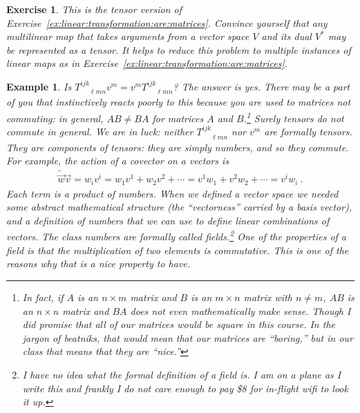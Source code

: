 \documentclass[
  11pt,
	colorful,
	raggedright,
]{tufte-style-thesis-flip}
\newtheorem{exercise}{Exercise}[section]
\newtheorem{example}{Example}[section]
\begin{document}
\begin{exercise}
This is the tensor version of Exercise~\ref{ex:linear:transformation:are:matrices}. Convince yourself that any multilinear map that takes arguments from a vector space $V$ and its dual $V^*$ may be represented as a tensor. It helps to reduce this problem to multiple instances of linear maps as in Exercise~\ref{ex:linear:transformation:are:matrices}.
\end{exercise}

\begin{example}
Is $T^{ijk}_{\phantom{ijk}\ell m n}v^m = v^m T^{ijk}_{\phantom{ijk}\ell m n}$? The answer is yes. There may be a part of you that instinctively reacts poorly to this because you are used to matrices not commuting: in general, $AB \neq BA$ for matrices $A$ and $B$.\footnote{In fact, if $A$ is an $n\times m$ matrix and $B$ is an $m\times n$ matrix with $n\neq m$, $AB$ is an $n\times n$ matrix and $BA$ does not even mathematically make sense. Though I did promise that all of our matrices would be square in this course. In the jargon of beatniks, that would mean that our matrices are ``boring,'' but in our class that means that they are ``nice.''} Surely tensors do not commute in general. We are in luck: neither $T^{ijk}_{\phantom{ijk}\ell m n}$ nor $v^m$ are formally tensors. They are \emph{components} of tensors: they are simply numbers, and so they commute. For example, the action of a covector on a vectors is
\begin{align}
\tilde{\vec{w}}\vec{v}  = w_iv^i
= w_1v^1 + w_2v^2 + \cdots = v^1 w_1 + v^2w_2 + \cdots = v^i w_i \ .
\end{align}
Each term is a product of numbers. When we defined a vector space we needed some abstract mathematical structure (the ``vectorness'' carried by a basis vector), and a definition of numbers that we can use to define linear combinations of vectors. The class numbers are formally called \emph{fields}.\footnote{I have no idea what the formal definition of a field is. I am on a plane as I write this and frankly I do not care enough to pay \$8 for in-flight wifi to look it up.} One of the properties of a field is that the multiplication of two elements is commutative. This is one of the reasons why that is a nice property to have.
\end{example}


\end{document}
